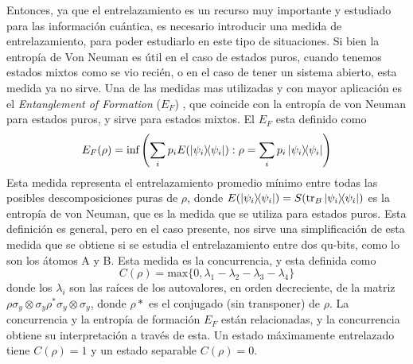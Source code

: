 Entonces, ya que el entrelazamiento es un recurso muy importante y estudiado para las información cuántica, es necesario introducir una medida de entrelazamiento, para poder estudiarlo en este tipo de situaciones. Si bien la entropía de Von Neuman es útil en el caso de estados puros, cuando tenemos estados mixtos como se vio recién, o en el caso de tener un sistema abierto, esta medida ya no sirve. Una de las medidas mas utilizadas y con mayor aplicación es el \textit{Entanglement of Formation} ($E_F$) \cite{an intro to entanglement measures}, que coincide con la entropía de von Neuman para estados puros, y sirve para estados mixtos. El $E_F$ esta definido como
\begin{equation}
    E_F(\rho)=\text{inf}\left( \sum_i p_i E(\ketbra{\psi_i}{\psi_i}) : \rho = \sum_i p_i\ketbra{\psi_i}{\psi_i}\right)
\end{equation}
Esta medida representa el entrelazamiento promedio mínimo entre todas las posibles descomposiciones puras de $\rho$, donde $E(\ketbra{\psi_i}{\psi_i})=S(\tr_B{\ketbra{\psi_i}{\psi_i}})$ es la entropía de von Neuman, que es la medida que se utiliza para estados puros. Esta definición es general, pero en el caso presente, nos sirve una simplificación de esta medida que se obtiene si se estudia el entrelazamiento entre dos qu-bits, como lo son los átomos A y B. Esta medida es la concurrencia, y esta definida como
\begin{equation}
    C(\rho)=\text{max}\{0,\lambda_1-\lambda_2-\lambda_3-\lambda_4\}
    \label{ec4:concurrencia}
\end{equation}
donde los $\lambda_i$ son las raíces de los autovalores, en orden decreciente, de la matriz $\rho\sigma_y\otimes\sigma_y\rho^*\sigma_y\otimes\sigma_y$, donde $\rho*$ es el conjugado (sin transponer) de $\rho$. La concurrencia y la entropía de formación $E_F$ están relacionadas, y la concurrencia obtiene su interpretación a través de esta. Un estado máximamente entrelazado tiene $C(\rho)=1$ y un estado separable $C(\rho)=0$. 


